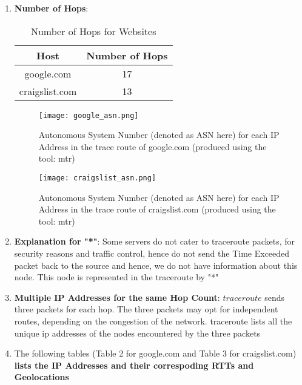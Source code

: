 \documentclass[12pt]{article}
\begin{document}
\begin{enumerate}
    \item \textbf{Number of Hops}:
    \begin{table}[h!]
        \centering
        \caption{Number of Hops for Websites}
        \begin{tabular}{|c|c|}
            \hline
            Host & Number of Hops \\
            \hline
            google.com & 17 \\
            craigslist.com & 13 \\
            \hline
        \end{tabular}
    \end{table}
    \begin{figure}[h!]
        \centering
        \texttt{[image: google\_asn.png]}
        \caption{Autonomous System Number (denoted as ASN here) for each IP Address in the trace route of google.com (produced using the tool: mtr)}
    \end{figure}
    \begin{figure}[h!]
        \centering
        \texttt{[image: craigslist\_asn.png]}
        \caption{Autonomous System Number (denoted as ASN here) for each IP Address in the trace route of craigslist.com (produced using the tool: mtr)}
    \end{figure}
    \item \textbf{Explanation for "*"}: Some servers do not cater to traceroute packets, for security reasons and traffic control, hence do not send the Time Exceeded packet back to the source and hence, we do not have information about this node. This node is represented in the traceroute by "*"
    \item \textbf{Multiple IP Addresses for the same Hop Count}: $traceroute$ sends three packets for each hop. The three packets may opt for independent routes, depending on the congestion of the network. traceroute lists all the unique ip addresses of the nodes encountered by the three packets
    \item The following tables (Table 2 for google.com and Table 3 for craigslist.com) \textbf{lists the IP Addresses and their correspoding RTTs and Geolocations}
    \begin{table}[h!]
        \centering
        \caption{IP Addresses and their GeoLocations for google.com. Note: NA means Not Available from the respective method listed in the column}
\end{table}
\end{enumerate}
\end{document}
